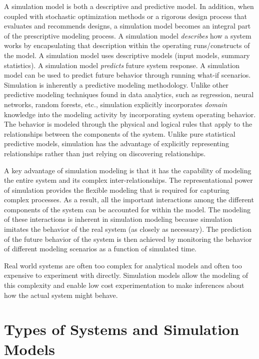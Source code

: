 \documentclass[
]{book}
\theoremstyle{definition}
\theoremstyle{definition}
\theoremstyle{definition}
\theoremstyle{definition}
\theoremstyle{remark}
\begin{document}
A simulation model is both a descriptive and predictive model. In addition, when coupled with stochastic optimization methods or a rigorous design process that evaluates and recommends designs, a simulation model becomes an integral part of the prescriptive modeling process. A
simulation model \emph{describes} how a system works by encapsulating that
description within the operating runs/constructs of the model. A
simulation model uses descriptive models (input models, summary
statistics). A simulation model \emph{predicts} future system response. A simulation model can be used to predict future behavior through running what-if scenarios. Simulation is inherently a predictive modeling methodology. Unlike other predictive modeling techniques found in data analytics, such as regression, neural networks, random forests, etc., simulation explicitly incorporates \emph{domain} knowledge into the modeling activity by incorporating system operating behavior. The behavior is modeled through the physical and logical rules that apply to the relationships between the components of the system. Unlike pure statistical predictive models, simulation has the advantage of explicitly representing relationships rather than just relying on discovering relationships.

A key advantage of simulation modeling is that it has the capability of
modeling the entire system and its complex inter-relationships. The
representational power of simulation provides the flexible modeling that
is required for capturing complex processes. As a result, all the
important interactions among the different components of the system can
be accounted for within the model. The modeling of these interactions is
inherent in simulation modeling because simulation imitates the behavior
of the real system (as closely as necessary). The prediction of the
future behavior of the system is then achieved by monitoring the
behavior of different modeling scenarios as a function of simulated
time.

Real world systems are often too complex for analytical models and
often too expensive to experiment with directly. Simulation models allow
the modeling of this complexity and enable low cost experimentation to
make inferences about how the actual system might behave.

\hypertarget{types-of-systems-and-simulation-models}{%
\section{Types of Systems and Simulation Models}\label{types-of-systems-and-simulation-models}}
\end{document}
